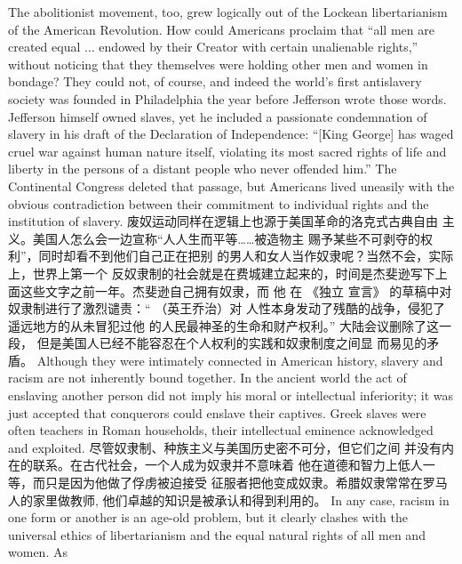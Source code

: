 \begin{paracol}{2}
The abolitionist movement, too, grew logically out of the Lockean libertarianism of the American Revolution. How could Americans proclaim that ``all men are created equal $\ldots$ endowed by their Creator with certain unalienable rights,'' without noticing that they themselves were holding other men and
women in bondage? They could not, of course, and indeed the
world's first antislavery society was founded in Philadelphia the
year before Jefferson wrote those words. Jefferson himself
owned slaves, yet he included a passionate condemnation of
slavery in his draft of the Declaration of Independence: ``[King
George] has waged cruel war against human nature itself, violating its most sacred rights of life and liberty in the persons of
a distant people who never offended him.'' The Continental
Congress deleted that passage, but Americans lived uneasily
with the obvious contradiction between their commitment to
individual rights and the institution of slavery.
\switchcolumn
废奴运动同样在逻辑上也源于美国革命的洛克式古典自由
主义。美国人怎么会一边宣称“人人生而平等……被造物主
赐予某些不可剥夺的权利”，同时却看不到他们自己正在把别
的男人和女人当作奴隶呢？当然不会，实际上，世界上第一个
反奴隶制的社会就是在费城建立起来的，时间是杰斐逊写下上
面这些文字之前一年。杰斐逊自己拥有奴隶，而 他 在 《独立
宣言》 的草稿中对奴隶制进行了激烈谴责：“ （英王乔治）对
人性本身发动了残酷的战争，侵犯了遥远地方的从未冒犯过他
的人民最神圣的生命和财产权利。” 大陆会议删除了这一段，
但是美国人已经不能容忍在个人权利的实践和奴隶制度之间显
而易见的矛盾。
\switchcolumn*
Although they were intimately connected in American history, slavery and racism are not inherently bound together. In
the ancient world the act of enslaving another person did not
imply his moral or intellectual inferiority; it was just accepted
that conquerors could enslave their captives. Greek slaves were
often teachers in Roman households, their intellectual eminence acknowledged and exploited.
\switchcolumn
尽管奴隶制、种族主义与美国历史密不可分，但它们之间
并没有内在的联系。在古代社会，一个人成为奴隶并不意味着
他在道德和智力上低人一等，而只是因为他做了俘虏被迫接受
征服者把他变成奴隶。希腊奴隶常常在罗马人的家里做教师,
他们卓越的知识是被承认和得到利用的。
\switchcolumn*
In any case, racism in one form or another is an age-old problem, but it clearly clashes with the universal ethics of libertarianism and the equal natural rights of all men and women. As

\end{paracol}
